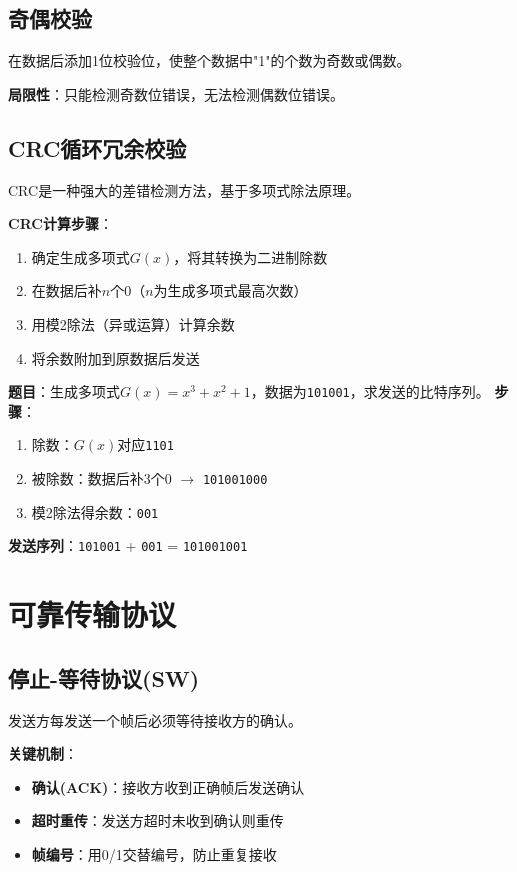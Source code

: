 \subsection{奇偶校验}
在数据后添加1位校验位，使整个数据中"1"的个数为奇数或偶数。

\textbf{局限性}：只能检测奇数位错误，无法检测偶数位错误。

\subsection{CRC循环冗余校验}
CRC是一种强大的差错检测方法，基于多项式除法原理。

\textbf{CRC计算步骤}：
\begin{enumerate}[leftmargin=2em,itemsep=0pt]
    \item 确定生成多项式$G(x)$，将其转换为二进制除数
    \item 在数据后补$n$个0（$n$为生成多项式最高次数）
    \item 用模2除法（异或运算）计算余数
    \item 将余数附加到原数据后发送
\end{enumerate}

\begin{examplebox}[例题3.1 CRC计算]
\textbf{题目}：生成多项式$G(x)=x^3+x^2+1$，数据为\texttt{101001}，求发送的比特序列。
\tcblower
\textbf{步骤}：
\begin{enumerate}[itemsep=0pt]
    \item 除数：$G(x)$对应\texttt{1101}
    \item 被除数：数据后补3个0 $\rightarrow$ \texttt{101001000}
    \item 模2除法得余数：\texttt{001}
\end{enumerate}
\textbf{发送序列}：\texttt{101001} + \texttt{001} = \texttt{101001001}
\end{examplebox}

\section{可靠传输协议}
\subsection{停止-等待协议(SW)}
发送方每发送一个帧后必须等待接收方的确认。

\textbf{关键机制}：
\begin{itemize}[leftmargin=2em,itemsep=0pt]
    \item \textbf{确认(ACK)}：接收方收到正确帧后发送确认
    \item \textbf{超时重传}：发送方超时未收到确认则重传
    \item \textbf{帧编号}：用0/1交替编号，防止重复接收
\end{itemize}

